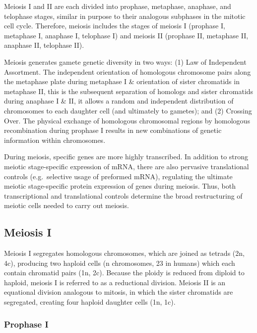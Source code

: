 Meiosis I and II are each divided into prophase, metaphase, anaphase, and telophase stages, similar in purpose to their analogous subphases in the mitotic cell cycle. Therefore, meiosis includes the stages of meiosis I (prophase I, metaphase I, anaphase I, telophase I) and meiosis II (prophase II, metaphase II, anaphase II, telophase II).

Meiosis generates gamete genetic diversity in two ways: (1) Law of Independent Assortment. The independent orientation of homologous chromosome pairs along the metaphase plate during metaphase I \& orientation of sister chromatids in metaphase II, this is the subsequent separation of homologs and sister chromatids during anaphase I \& II, it allows a random and independent distribution of chromosomes to each daughter cell (and ultimately to gametes); and (2) Crossing Over. The physical exchange of homologous chromosomal regions by homologous recombination during prophase I results in new combinations of genetic information within chromosomes.

During meiosis, specific genes are more highly transcribed. In addition to strong meiotic stage-specific expression of mRNA, there are also pervasive translational controls (e.g.~selective usage of preformed mRNA), regulating the ultimate meiotic stage-specific protein expression of genes during meiosis. Thus, both transcriptional and translational controls determine the broad restructuring of meiotic cells needed to carry out meiosis.

\hypertarget{meiosis-i}{%
\subsection{Meiosis I}\label{meiosis-i}}

Meiosis I segregates homologous chromosomes, which are joined as tetrads (2n, 4c), producing two haploid cells (n chromosomes, 23 in humans) which each contain chromatid pairs (1n, 2c). Because the ploidy is reduced from diploid to haploid, meiosis I is referred to as a reductional division. Meiosis II is an equational division analogous to mitosis, in which the sister chromatids are segregated, creating four haploid daughter cells (1n, 1c).

\hypertarget{prophase-i}{%
\subsubsection{Prophase I}\label{prophase-i}}

